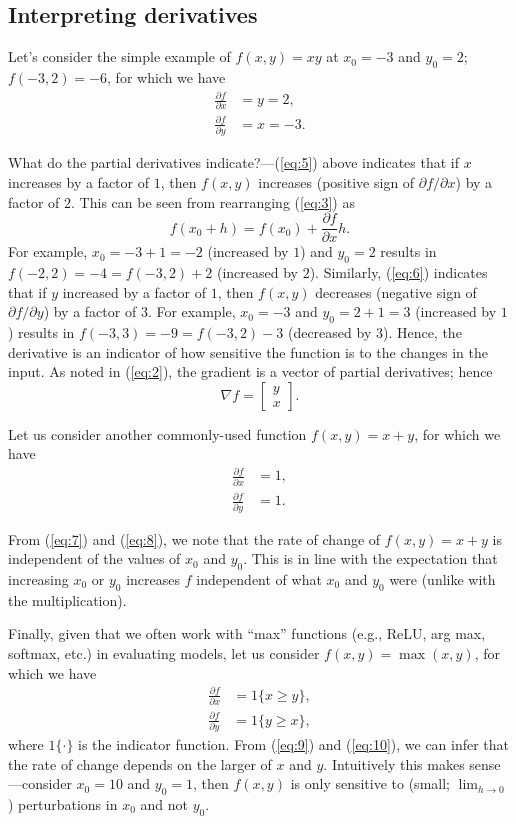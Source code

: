 \subsection{Interpreting derivatives}
\label{sec:2.1}

Let's consider the simple example of $f(x, y) = xy$ at $x_0 = -3$ and $y_0 = 2$; $f(-3, 2) = -6$, for which we have
\begin{align}
    \label{eq:5} \frac{\partial f}{\partial x} &= y = 2, \\
    \label{eq:6} \frac{\partial f}{\partial y} &= x = -3.
\end{align}

What do the partial derivatives indicate?---(\ref{eq:5}) above indicates that if $x$ increases by a factor of $1$, then $f(x, y)$ increases (positive sign of $\partial f/\partial x$) by a factor of $2$. This can be seen from rearranging (\ref{eq:3}) as 
$$
    f(x_0 + h) = f(x_0) + \frac{\partial f}{\partial x} h.
$$
For example, $x_0 = -3 + 1 = -2$ (increased by $1$) and $y_0 = 2$ results in $f(-2, 2) = -4 = f(-3, 2) + 2$ (increased by $2$). Similarly, (\ref{eq:6}) indicates that if $y$ increased by a factor of $1$, then $f(x, y)$ decreases (negative sign of $\partial f/\partial y$) by a factor of $3$. For example, $x_0 = -3$ and $y_0 = 2 + 1 = 3$ (increased by $1$) results in $f(-3, 3) = -9 = f(-3, 2) - 3$ (decreased by $3$). Hence, the derivative is an indicator of how sensitive the function is to the changes in the input. As noted in (\ref{eq:2}), the gradient is a vector of partial derivatives; hence 
$$
    \nabla f = \begin{bmatrix}
    y \\
    x
    \end{bmatrix}.
$$

Let us consider another commonly-used function $f(x, y) = x + y$, for which we have
\begin{align}
    \label{eq:7} \frac{\partial f}{\partial x} &= 1, \\
    \label{eq:8} \frac{\partial f}{\partial y} &= 1.
\end{align}

From (\ref{eq:7}) and (\ref{eq:8}), we note that the rate of change of $f(x, y) = x + y$ is independent of the values of $x_0$ and $y_0$. This is in line with the expectation that increasing $x_0$ or $y_0$ increases $f$ independent of what $x_0$ and $y_0$ were (unlike with the multiplication).

Finally, given that we often work with ``max'' functions (e.g., ReLU, arg max, softmax, etc.) in evaluating models, let us consider $f(x, y) = \max(x, y)$, for which we have
\begin{align}
    \label{eq:9} \frac{\partial f}{\partial x} &= 1\{x \geq y\}, \\
    \label{eq:10} \frac{\partial f}{\partial y} &= 1\{y \geq x\},
\end{align}
where $1\{\cdot\}$ is the indicator function. From (\ref{eq:9}) and (\ref{eq:10}), we can infer that the rate of change depends on the larger of $x$ and $y$. Intuitively this makes sense---consider $x_0 = 10$ and $y_0 = 1$, then $f(x, y)$ is only sensitive to (small; $\lim_{h \rightarrow 0}$) perturbations in $x_0$ and not $y_0$.

